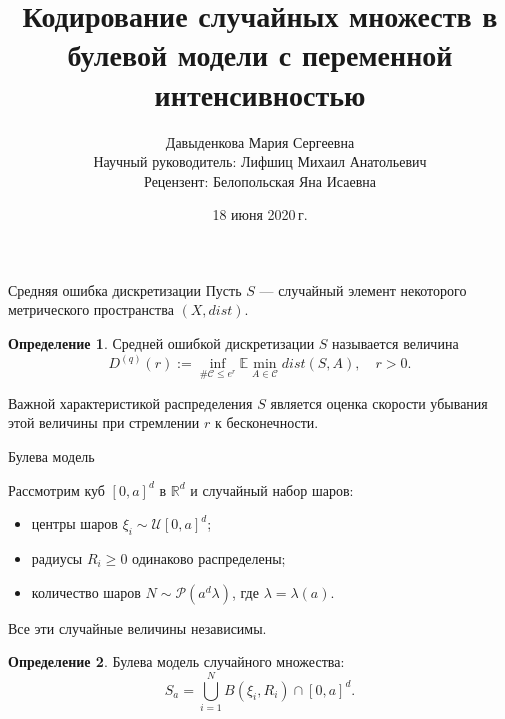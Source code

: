 \documentclass[aspectratio=1610]{beamer}
\title[Short title]{Кодирование случайных множеств в булевой модели с переменной интенсивностью} %
\author{Давыденкова Мария Сергеевна\\\medskip
Научный руководитель: Лифшиц Михаил Анатольевич \\
Рецензент: Белопольская Яна Исаевна}
\institute[SPBU] 
{
Санкт-Петербургский государственный университет
\medskip
}
\date{18 июня 2020\,г.} %
\theoremstyle{plain}
\theoremstyle{definition}
\newtheorem*{defn}{Определение}
\theoremstyle{remark}
\def\geq{\geqslant}
\def\leq{\leqslant}
\newcommand{\cuplim}{\bigcup\limits}
\newcommand{\R}{\mathbb{R}}
\newcommand{\E}{\mathbb{E}}
\begin{document}
\begin{frame}
\titlepage %
\end{frame}

\begin{frame}{Средняя ошибка дискретизации}
Пусть $S$  ---  случайный элемент некоторого метрического пространства $(X, dist)$.

\begin{defn}
Средней ошибкой дискретизации $S$ называется величина  $$D^{(q)}(r) := \inf\limits_{\#\mathcal{C}\leq e^r}\E \min\limits_{A\in\mathcal{C}}dist(S, A), \quad r>0.$$
\end{defn}{}

Важной характеристикой распределения $S$ является оценка скорости убывания этой величины при стремлении $r$ к бесконечности.

\end{frame}

\begin{frame}{Булева модель}

Рассмотрим куб $[0,a]^d$ в $\R^d$ и  случайный набор шаров: 
\begin{itemize}
    \item центры шаров $\xi_i \sim \mathcal{U}[0, a]^d$;
    \item радиусы $R_i \geq 0$ одинаково распределены;
    \item  количество шаров $N\sim\mathcal{P}(a^d\lambda)$, где $\lambda = \lambda(a)$.
\end{itemize}   
Все эти случайные величины независимы. 

\begin{defn}
Булева модель случайного множества:
$$S_a = \cuplim_{i=1}^N B(\xi_i, R_i) \cap [0,a]^d.$$
\end{defn}


    
\end{frame}
\end{document}
